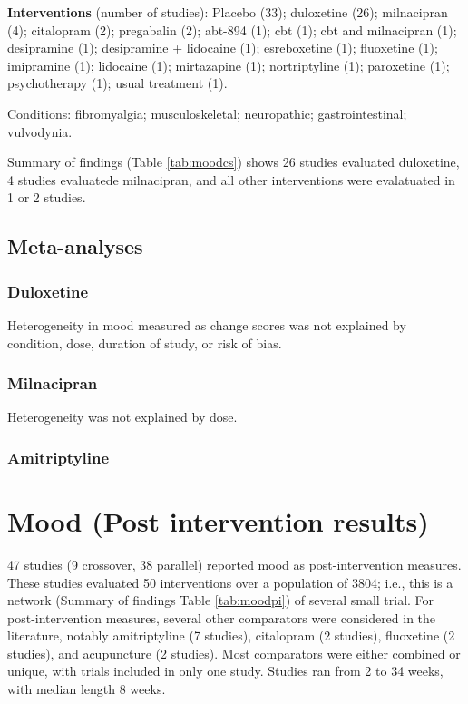 \documentclass{report}\usepackage[]{graphicx}\usepackage[]{color}
\begin{document}
\textbf{Interventions} (number of studies): Placebo (33); duloxetine (26); milnacipran (4); citalopram (2); pregabalin (2); abt-894 (1); cbt (1); cbt and milnacipran (1); desipramine (1); desipramine + lidocaine (1); esreboxetine (1); fluoxetine (1); imipramine (1); lidocaine (1); mirtazapine (1); nortriptyline (1); paroxetine (1); psychotherapy (1); usual treatment (1).

Conditions: fibromyalgia; musculoskeletal; neuropathic; gastrointestinal; vulvodynia.

Summary of findings (Table \ref{tab:moodcs}) shows 26 studies evaluated duloxetine, 4 studies evaluatede milnacipran, and all other interventions were evalatuated in 1 or 2 studies.

\subsection{Meta-analyses}

\subsubsection{Duloxetine}

Heterogeneity in mood measured as change scores was not explained by condition, dose, duration of study, or risk of bias.

\subsubsection{Milnacipran}

Heterogeneity was not explained by dose.

\subsubsection{Amitriptyline}


\section{Mood (Post intervention results)}

47 studies (9 crossover, 38 parallel) reported mood as post-intervention measures. These studies evaluated 50 interventions over a population of 3804; i.e., this is a network (Summary of findings Table \ref{tab:moodpi}) of several small trial. For post-intervention measures, several other comparators were considered in the literature, notably amitriptyline (7 studies), citalopram (2 studies), fluoxetine (2 studies), and acupuncture (2 studies). Most comparators were either combined or unique, with trials included in only one study. Studies ran from 2 to 34 weeks, with median length 8 weeks.
\end{document}
